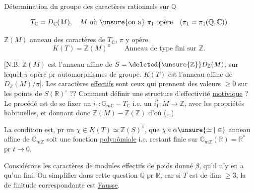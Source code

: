 Détermination du groupe des caractères rationnels sur $\mathbb Q$

\[
T_{\mathbb C}=D_{\mathbb C}(M),\quad M\text{ où \unsure{on a} }\pi_1\text{ opère}\quad(\pi_1=\pi_1(\mathbb Q,\mathbb C))
\]

$\mathbb Z(M)$ anneau des caractères  de $T_{\mathbb C}$, $\pi$ y opère
\[
K(T)=\mathbb Z(M)^\pi\qquad\text{Anneau de type fini sur }\mathbb Z.
\]

[N.B. $\mathbb Z(M)$ est l'anneau affine de $S=\deleted{\unsure{\mathbb Z}}D_{\mathbb Z}(M)$, sur lequel $\pi$ opère pr automorphismes de groupe. $K(T)$ est l'anneau affine de $D_{\mathbb Z}(M)/\pi$]. Les caractères \uline{effectifs} sont ceux qui prennent des valeurs $\geq0$ sur les points de $S(\mathbb R)^\circ$ ?? Comment définir une structure d'effectivité \uline{motivique} ? Le procédé  est de se fixer un $i_1:\mathbb G_{m\mathbb C}\mathbin{-}T_{\mathbb C}$ i.e. un $i_1^*:M\longrightarrow\mathbb Z$, avec les propriétés habituelles, et donnant donc $\mathbb Z(M)\mathbin{-}\mathbb Z(\mathbb Z)$ d'où
(\ldots)


La condition est,  pr un $\chi\in K(T)\simeq\mathbb Z(S)^\pi$, que $\chi\circ\alpha\unsure{\simeq|\in}$  anneau affine de $\mathbb G_{m\mathbb Z}$ soit une fonction \uline{polynômiale} i.e. restant finie sur $\mathbb G_{m\mathbb Z}(\mathbb R)=\mathbb R^*$ pr $t\to0$.

Considérons les caractères de modules effectifs de poids donné $\beta$,  qu'il n'y en a qu'un  fini. On    simplifier dans cette question $\mathbb Q$ pr $\mathbb R$,  car si $T$ est de dim $\geq3$, la  de finitude correspondante est \uline{Fausse}.

